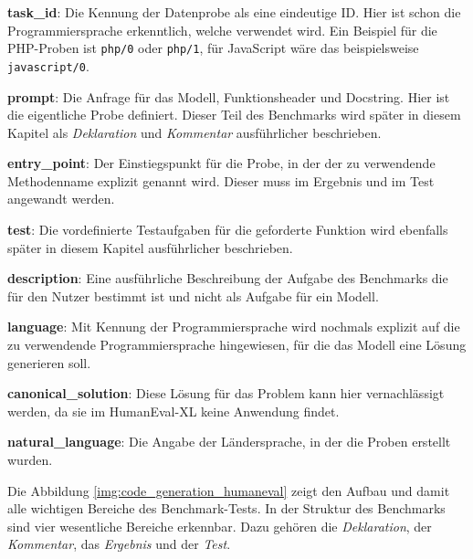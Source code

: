 \begin{myenumerate}
	\item \textbf{task\_id}: Die Kennung der Datenprobe als eine eindeutige ID. Hier ist schon die Programmiersprache erkenntlich, welche verwendet wird. Ein Beispiel für die PHP-Proben ist \texttt{php/0} oder \texttt{php/1}, für JavaScript wäre das beispielsweise \texttt{javascript/0}.
	\item \textbf{prompt}: Die Anfrage für das Modell, Funktionsheader und Docstring. Hier ist die eigentliche Probe definiert. Dieser Teil des Benchmarks wird später in diesem Kapitel als \textit{Deklaration} und \textit{Kommentar} ausführlicher beschrieben.
	\item \textbf{entry\_point}: Der Einstiegspunkt für die Probe, in der der zu verwendende Methodenname explizit genannt wird. Dieser muss im Ergebnis und im Test angewandt werden.
	\item \textbf{test}: Die vordefinierte Testaufgaben für die geforderte Funktion wird ebenfalls später in diesem Kapitel ausführlicher beschrieben.
	\item \textbf{description}: Eine ausführliche Beschreibung der Aufgabe des Benchmarks die für den Nutzer bestimmt ist und nicht als Aufgabe für ein Modell.
	\item \textbf{language}: Mit Kennung der Programmiersprache wird nochmals explizit auf die zu verwendende Programmiersprache hingewiesen, für die das Modell eine Lösung generieren soll.
	\item \textbf{canonical\_solution}: Diese Lösung für das Problem kann hier vernachlässigt werden, da sie im HumanEval-XL keine Anwendung findet.
	\item \textbf{natural\_language}: Die Angabe der Ländersprache, in der die Proben erstellt wurden.
\end{myenumerate}

Die Abbildung \ref{img:code_generation_humaneval} zeigt den Aufbau und damit alle wichtigen Bereiche des Benchmark-Tests. In der Struktur des Benchmarks sind vier wesentliche Bereiche erkennbar. Dazu gehören die \textit{Deklaration}, der \textit{Kommentar}, das \textit{Ergebnis} und der \textit{Test}.\vspace{0.2cm}

